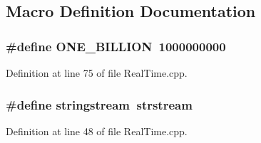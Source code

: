 \subsection{Macro Definition Documentation}
\subsubsection[{\texorpdfstring{O\+N\+E\+\_\+\+B\+I\+L\+L\+I\+ON}{ONE_BILLION}}]{\setlength{\rightskip}{0pt plus 5cm}\#define O\+N\+E\+\_\+\+B\+I\+L\+L\+I\+ON~1000000000}\hypertarget{vamp-sdk_2_real_time_8cpp_af05eba65a3d4d0547dba7e69e440db2c}{}\label{vamp-sdk_2_real_time_8cpp_af05eba65a3d4d0547dba7e69e440db2c}


Definition at line 75 of file Real\+Time.\+cpp.

\subsubsection[{\texorpdfstring{stringstream}{stringstream}}]{\setlength{\rightskip}{0pt plus 5cm}\#define stringstream~strstream}\hypertarget{vamp-sdk_2_real_time_8cpp_af265757a67f4d68101c17dbc0ce1294e}{}\label{vamp-sdk_2_real_time_8cpp_af265757a67f4d68101c17dbc0ce1294e}


Definition at line 48 of file Real\+Time.\+cpp.

